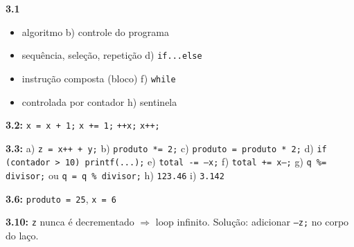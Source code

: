 \documentclass[12pt,a4paper]{article}
\begin{document}
\begin{tcolorbox}[colback=deitellightblue,colframe=deitelblue,title={\bfseries\large Respostas Resumidas}]

\textbf{3.1}
\begin{itemize}[noitemsep]
  \item[a)] algoritmo \quad b) controle do programa
  \item[c)] sequência, seleção, repetição \quad d) \texttt{if...else}
  \item[e)] instrução composta (bloco) \quad f) \texttt{while}
  \item[g)] controlada por contador \quad h) sentinela
\end{itemize}

\medskip\textbf{3.2:} \texttt{x = x + 1;} \quad \texttt{x += 1;} \quad \texttt{++x;} \quad \texttt{x++;}

\medskip\textbf{3.3:} a) \texttt{z = x++ + y;} \quad b) \texttt{produto *= 2;} \quad
c) \texttt{produto = produto * 2;} \quad
d) \texttt{if (contador > 10) printf(...);} \quad
e) \texttt{total -= --x;} \quad f) \texttt{total += x--;} \quad
g) \texttt{q \%= divisor;} ou \texttt{q = q \% divisor;} \quad
h) \texttt{123.46} \quad i) \texttt{3.142}

\medskip\textbf{3.6:} \texttt{produto = 25}, \texttt{x = 6}

\medskip\textbf{3.10:} \texttt{z} nunca é decrementado $\Rightarrow$ loop infinito.
Solução: adicionar \texttt{--z;} no corpo do laço.

\end{tcolorbox}
\end{document}

